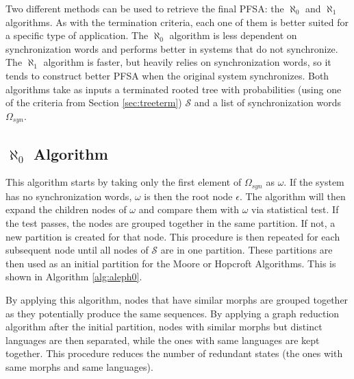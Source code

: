 {Two different methods can be used to retrieve the final PFSA: the $\aleph_0$ and $\aleph_1$ algorithms. As with the termination criteria, each one of them is better suited for a specific type of application. The $\aleph_0$ algorithm is less dependent on synchronization words and performs better in systems that do not synchronize. The $\aleph_1$ algorithm is faster, but heavily relies on synchronization words, so it tends to construct better PFSA when the original system synchronizes. Both algorithms take as inputs a terminated rooted tree with probabilities (using one of the criteria from Section \ref{sec:treeterm}) $\mathcal{S}$ and a list of synchronization words $\Omega_{syn}$.

\subsection{$\aleph_0$ Algorithm}

This algorithm starts by taking only the first element of $\Omega_{syn}$ as $\omega$. If the system has no synchronization words, $\omega$ is then the root node $\epsilon$. The algorithm will then expand the children nodes of $\omega$ and compare them with $\omega$ via statistical test. If the test passes, the nodes are grouped together in the same partition. If not, a new partition is created for that node. This procedure is then repeated for each subsequent node until all nodes of $\mathcal{S}$ are in one partition. These partitions are then used as an initial partition for the Moore or Hopcroft Algorithms. This is shown in Algorithm \ref{alg:aleph0}.

By applying this algorithm, nodes that have similar morphs are grouped together as they potentially produce the same sequences. By applying a graph reduction algorithm after the initial partition, nodes with similar morphs but distinct languages are then separated, while the ones with same languages are kept together. This procedure reduces the number of redundant states (the ones with same morphs and same languages).

}
